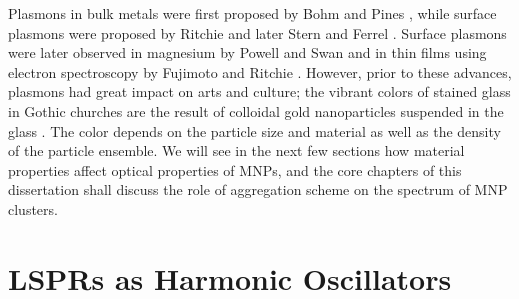 \documentclass [11pt, proquest] {uwthesis}[2016/11/22]
\begin{document}
Plasmons in bulk metals were first proposed by Bohm and Pines \cite{BohmPines1,BohmPines2,BohmPines3}, while surface plasmons were proposed by Ritchie \cite{Ritchieplasma} and later Stern and Ferrel \cite{SternFerrel}. Surface plasmons were later observed in magnesium by Powell and Swan\cite{PowellSwan} and in thin films using electron spectroscopy by Fujimoto \cite{Fujimoto} and Ritchie \cite{Ritchie}. However, prior to these advances, plasmons had great impact on arts and culture; the vibrant colors of stained glass in Gothic churches are the result of colloidal gold nanoparticles suspended in the glass \cite{stainedglass}. The color depends on the particle size and material as well as the density of the particle ensemble. We will see in the next few sections how material properties affect optical properties of MNPs, and the core chapters of this dissertation shall discuss the role of aggregation scheme on the spectrum of MNP clusters.

\section{LSPRs as Harmonic Oscillators}
\end{document}
